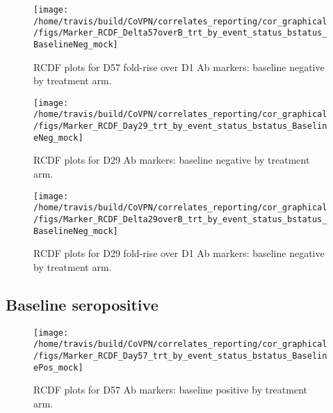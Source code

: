 \documentclass[]{book}
\theoremstyle{definition}
\theoremstyle{definition}
\theoremstyle{definition}
\newcommand{\1}{\mathbbm{1}}
\begin{document}
\clearpage
\begin{figure}[H]

{\centering \texttt{[image: /home/travis/build/CoVPN/correlates\_reporting/cor\_graphical/figs/Marker\_RCDF\_Delta57overB\_trt\_by\_event\_status\_bstatus\_BaselineNeg\_mock]} 

}

\caption{RCDF plots for D57 fold-rise over D1 Ab markers: baseline negative by treatment arm.}\label{fig:unnamed-chunk-14}
\end{figure}

\clearpage
\begin{figure}[H]

{\centering \texttt{[image: /home/travis/build/CoVPN/correlates\_reporting/cor\_graphical/figs/Marker\_RCDF\_Day29\_trt\_by\_event\_status\_bstatus\_BaselineNeg\_mock]} 

}

\caption{RCDF plots for D29 Ab markers: baseline negative by treatment arm.}\label{fig:unnamed-chunk-15}
\end{figure}

\clearpage
\begin{figure}[H]

{\centering \texttt{[image: /home/travis/build/CoVPN/correlates\_reporting/cor\_graphical/figs/Marker\_RCDF\_Delta29overB\_trt\_by\_event\_status\_bstatus\_BaselineNeg\_mock]} 

}

\caption{RCDF plots for D29 fold-rise over D1 Ab markers: baseline negative by treatment arm.}\label{fig:unnamed-chunk-16}
\end{figure}

\clearpage

\hypertarget{baseline-seropositive-1}{%
\subsection{Baseline seropositive}\label{baseline-seropositive-1}}

\begin{figure}[H]

{\centering \texttt{[image: /home/travis/build/CoVPN/correlates\_reporting/cor\_graphical/figs/Marker\_RCDF\_Day57\_trt\_by\_event\_status\_bstatus\_BaselinePos\_mock]} 

}

\caption{RCDF plots for D57 Ab markers: baseline positive by treatment arm.}\label{fig:unnamed-chunk-17}
\end{figure}
\end{document}
